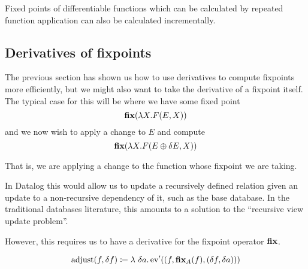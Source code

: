 \begin{corollary}
\label{corollary:diffFP}
  Fixed points of differentiable functions which can be calculated by repeated
  function application can also be calculated incrementally.
\end{corollary}

\subsection{Derivatives of fixpoints}
\label{sec:fixpointDerivatives}

The previous section has shown us how to use derivatives to compute fixpoints
more efficiently, but we might also want to take the derivative of a fixpoint
itself. The typical case for this will be where we have some fixed point
$$\textbf{fix} (\lambda X . F(E, X))$$
and we now wish to apply a change to $E$ and compute
$$\textbf{fix} (\lambda X . F(E \oplus \delta E, X))$$

That is, we are applying a change to the function whose fixpoint we are taking.

In Datalog this would allow us to update a recursively defined relation given an
update to a non-recursive dependency of it, such as the base database. In the
traditional databases literature, this amounts to a solution to the ``recursive
view update problem''.

However, this requires us to have a derivative for the fixpoint operator $\textbf{fix}$.

\newcommand{\theadjustment}{\operatorname{adjust}}

\begin{defn}
  $$\theadjustment(f, \change{f}) \defeq \lambda\ \change{a} . \derive{\ev}((f,
  \fixpoint_A(f), (\change{f}, \change{a})))$$
\end{defn}


